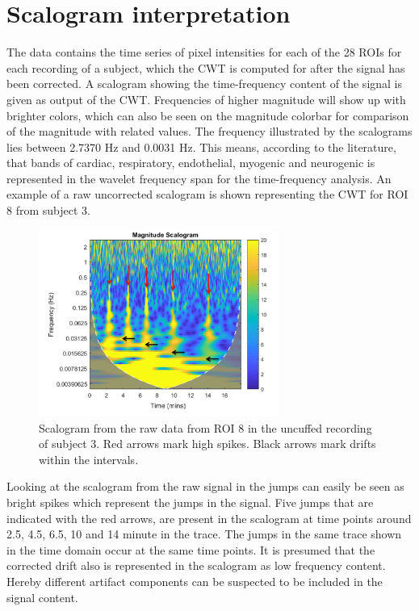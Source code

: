 \section{Scalogram interpretation}
\label{sec:scalogram}
The data contains the time series of pixel intensities for each of the 28 ROIs for each recording of a subject, which the CWT is computed for after the signal has been corrected.  
A scalogram showing the time-frequency content of the signal is given as output of the CWT. Frequencies of higher magnitude will show up with brighter colors, which can also be seen on the magnitude colorbar for comparison of the magnitude with related values.
The frequency illustrated by the scalograms lies between 2.7370 Hz and 0.0031 Hz. This means, according to the literature, that bands of cardiac, respiratory, endothelial, myogenic and neurogenic is represented in the wavelet frequency span for the time-frequency analysis. \cite{geyer2004, sagaidachnyi2014}
An example of a raw uncorrected scalogram is shown  representing the CWT for ROI 8 from subject 3.

\begin{figure}[H]
	\includegraphics[width=0.7\textwidth]{figures/uncuffed_sub3_roi8_uncorr}
	\caption{Scalogram from the raw data from ROI 8 in the uncuffed recording of subject 3. Red arrows mark high spikes. Black arrows mark drifts within the intervals.}
	\label{fig:scalogram_uncorr}
\end{figure}

Looking at the scalogram from the raw signal in  the jumps can easily be seen as bright spikes which represent the jumps in the signal. Five jumps that are indicated with the red arrows, are present in the scalogram at time points around 2.5, 4.5, 6.5, 10 and 14 minute in the trace. The jumps in the same trace shown in the time domain occur at the same time points. It is presumed that the corrected drift also is represented in the scalogram as low frequency content. Hereby different artifact components can be suspected to be included in the signal content. 

